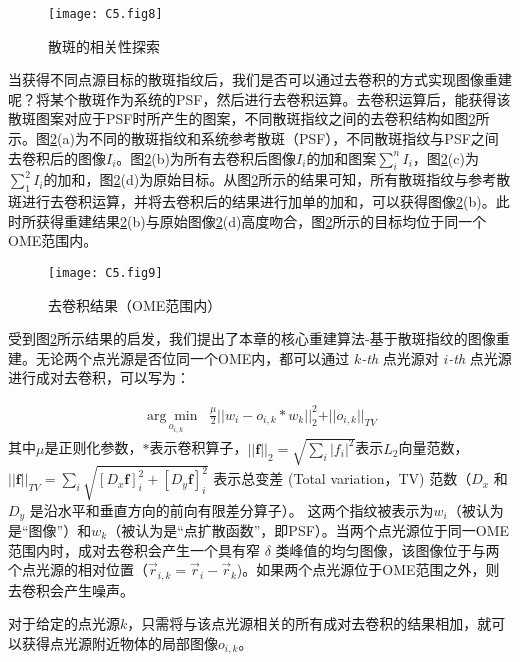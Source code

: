 \begin{figure}[htp]
	\centering
	\texttt{[image: C5.fig8]}
	\caption{散斑的相关性探索}
	\label{fig:5.8}
\end{figure}

当获得不同点源目标的散斑指纹后，我们是否可以通过去卷积的方式实现图像重建呢？将某个散斑作为系统的PSF，然后进行去卷积运算\cite{biggs_acceleration_1997}。去卷积运算后，能获得该散斑图案对应于PSF时所产生的图案，不同散斑指纹之间的去卷积结构如图\ref{fig:5.9}所示。图\ref{fig:5.9}(a)为不同的散斑指纹和系统参考散斑（PSF），不同散斑指纹与PSF之间去卷积后的图像$I_{i}$。图\ref{fig:5.9}(b)为所有去卷积后图像$I_{i}$的加和图案$\sum_{i}^{n} I_{i}$，图\ref{fig:5.9}(c)为$\sum_{1}^{2} I_{i}$的加和，图\ref{fig:5.9}(d)为原始目标。从图\ref{fig:5.9}所示的结果可知，所有散斑指纹与参考散斑进行去卷积运算，并将去卷积后的结果进行加单的加和，可以获得图像\ref{fig:5.9}(b)。此时所获得重建结果\ref{fig:5.9}(b)与原始图像\ref{fig:5.9}(d)高度吻合，图\ref{fig:5.9}所示的目标均位于同一个OME范围内。

\begin{figure}[htp]
	\centering
	\texttt{[image: C5.fig9]}
	\caption{去卷积结果（OME范围内）}
	\label{fig:5.9}
\end{figure}

受到图\ref{fig:5.9}所示结果的启发，我们提出了本章的核心重建算法-基于散斑指纹的图像重建。无论两个点光源是否位同一个OME内，都可以通过 $k$\textsl{-th} 点光源对 $i$\textsl{-th} 点光源进行成对去卷积，可以写为：

\begin{equation}
	\begin{aligned}
\underset{o_{i,k}}{\arg\min \;\;}
\frac{\mu}{2} \vert\vert w_{i}-o_{i,k}* w_{k}\vert\vert^2_{2}+\vert\vert o_{i,k}\vert\vert_{TV}
\label{eq:5.4}
\end{aligned}
\end{equation}
其中$\mu$是正则化参数，$*$表示卷积算子，$\vert\vert \mathbf{f}\vert\vert_2 = \sqrt{\sum_{i} \vert f_i\vert^2} $表示$L_{2}$向量范数，
$\vert\vert \mathbf{f} \vert\vert_{TV} = \sum_{i}\sqrt{[D_x\mathbf{f}]_i^2 +[D_y\mathbf{f}]_i^2}$ 表示总变差 (Total variation，TV) 范数（$D_x$ 和 $D_y$ 是沿水平和垂直方向的前向有限差分算子）。
这两个指纹被表示为$w_{i}$（被认为是“图像”）和$w_{k}$（被认为是“点扩散函数”，即PSF）。当两个点光源位于同一OME范围内时，成对去卷积会产生一个具有窄 $\delta$ 类峰值的均匀图像，该图像位于与两个点光源的相对位置（$\vec{r} _{i,k} = \vec{r}_i - \vec{r}_k$)。如果两个点光源位于OME范围之外，则去卷积会产生噪声。

对于给定的点光源$k$，只需将与该点光源相关的所有成对去卷积的结果相加，就可以获得点光源附近物体的局部图像$o_{i,k}$。

